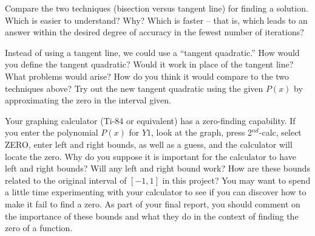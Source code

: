 \documentclass
[justified,nohyper]
{tufte-handout}
\theoremstyle{mydef}
\begin{document}
Compare the two techniques (bisection versus tangent line) for finding a solution. Which is easier to understand? Why? Which is faster -- that is, which leads to an answer within the desired degree of accuracy in the fewest number of iterations?

Instead of using a tangent line, we could use a ``tangent quadratic.'' How would you define the tangent quadratic? Would it work in place of the tangent line? What problems would arise? How do you think it would compare to the two techniques above? Try out the new tangent quadratic using the given $P(x)$ by approximating the zero in the interval given.

Your graphing calculator (Ti-84 or equivalent) has a zero-finding capability. If you enter the polynomial $P(x)$ for $Y1$, look at the graph, press 2$^{nd}$-calc, select ZERO, enter left and right bounds, as well as a guess, and the calculator will locate the zero. Why do you suppose it is important for the calculator to have left and right bounds? Will any left and right bound work? How are these bounds related to the original interval of $[-1,1]$ in this project? You may want to spend a little time experimenting with your calculator to see if you can discover how to make it fail to find a zero. As part of your final report, you should comment on the importance of these bounds and what they do in the context of finding the zero of a function.
\end{document}
